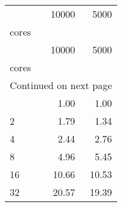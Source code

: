 \begin{longtable}{lrr}
	\speedup\\
\toprule
 & 10000 & 5000 \\
cores &  &  \\
\midrule
\endfirsthead
\toprule
 & 10000 & 5000 \\
cores &  &  \\
\midrule
\endhead
\midrule
\multicolumn{3}{r}{Continued on next page} \\
\midrule
\endfoot
\bottomrule
\endlastfoot
1 & 1.00 & 1.00 \\
2 & 1.79 & 1.34 \\
4 & 2.44 & 2.76 \\
8 & 4.96 & 5.45 \\
16 & 10.66 & 10.53 \\
32 & 20.57 & 19.39 \\
\end{longtable}

